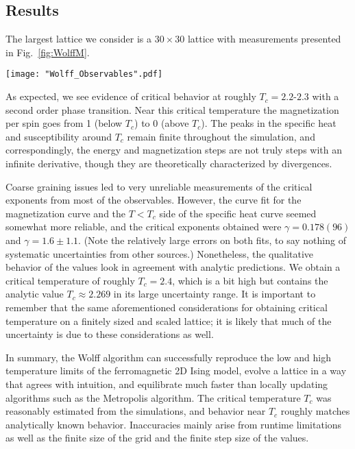 \documentclass[twocolumn,aps]{revtex4-1} %
\begin{document}
\subsection{Results}
The largest lattice we consider is a $30 \times 30$ lattice with measurements presented in Fig.~\ref{fig:WolffM}.
\begin{figure*}
	\texttt{[image: "Wolff\_Observables".pdf]}
	\caption{\label{fig:WolffM}Plots showing the mean energy per spin, specific heat per spin, mean (absolute) magnetization per spin, magnetic susceptibility on a 30 $\times$ 30 lattice from $T = 1.6$ to $T = 2.9$ in increments of $\Delta T = .01$. The lines overlaid on the data are lines of best-of-fit determined using \texttt{optimize.curve\_fit}. Using the Wolff algorithm, the equilibration time at each temperature is 30 steps and each data point is obtained from 150 measurements.}
\end{figure*}
As expected, we see evidence of critical behavior at roughly $T_c = 2.2$-$2.3$ with a second order phase transition. Near this critical temperature the magnetization per spin goes from 1 (below $T_c$) to 0 (above $T_c$). The peaks in the specific heat and susceptibility around $T_c$ remain finite throughout the simulation, and correspondingly, the energy and magnetization steps are not truly steps with an infinite derivative, though they are theoretically characterized by divergences. 

Coarse graining issues led to very unreliable measurements of the critical exponents from most of the observables. However, the curve fit for the magnetization curve and the $T < T_c$ side of the specific heat curve seemed somewhat more reliable, and the critical exponents obtained were $\gamma = 0.178(96)$ and $\gamma = 1.6 \pm 1.1$. (Note the relatively large errors on both fits, to say nothing of systematic uncertainties from other sources.) Nonetheless, the qualitative behavior of the values look in agreement with analytic predictions. We obtain a critical temperature of roughly $T_c = 2.4$, which is a bit high but contains the analytic value $T_c \approx 2.269$ in its large uncertainty range. It is important to remember that the same aforementioned considerations for obtaining critical temperature on a finitely sized and scaled lattice; it is likely that much of the uncertainty is due to these considerations as well. 

In summary, the Wolff algorithm can successfully reproduce the low and high temperature limits of the ferromagnetic 2D Ising model, evolve a lattice in a way that agrees with intuition, and equilibrate much faster than locally updating algorithms such as the Metropolis algorithm. The critical temperature $T_c$ was reasonably estimated from the simulations, and behavior near $T_c$ roughly matches analytically known behavior. Inaccuracies mainly arise from runtime limitations as well as the finite size of the grid and the finite step size of the values.
\end{document}
